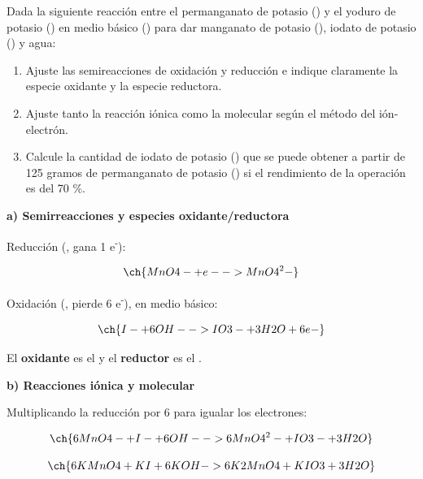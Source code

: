 \begin{exerciseEVAU}

Dada la siguiente reacción entre el permanganato de potasio () y el yoduro de potasio () en medio básico () para dar manganato de potasio (), iodato de potasio () y agua:
    \begin{enumerate}[label=\letraminuscula]
        \item Ajuste las semireacciones de oxidación y reducción e indique claramente la especie
oxidante y la especie reductora.
        \item Ajuste tanto la reacción iónica como la molecular según el método del ión-electrón.
        \item Calcule la cantidad de iodato de potasio () que se puede obtener a partir de 125 gramos de permanganato de potasio () si el rendimiento de la operación es del 70 \%.
    \end{enumerate}

    \begin{solu}

        \textbf{a) Semirreacciones y especies oxidante/reductora}

        Reducción (, gana 1 e\textsuperscript{-}):

        \begin{equation*}
            \ch{MnO4- + e- -> MnO4^2-}
        \end{equation*}

        Oxidación (, pierde 6 e\textsuperscript{-}), en medio básico:

        \begin{equation*}
            \ch{I- + 6 OH- -> IO3- + 3 H2O + 6 e-}
        \end{equation*}

        El \textbf{oxidante} es el  y el \textbf{reductor} es el .

        \textbf{b) Reacciones iónica y molecular}

        Multiplicando la reducción por 6 para igualar los electrones:

        \begin{equation*}
            \ch{6 MnO4- + I- + 6 OH- -> 6 MnO4^2- + IO3- + 3 H2O}
        \end{equation*}

        \begin{equation*}
            \ch{6 KMnO4 + KI + 6 KOH -> 6 K2MnO4 + KIO3 + 3 H2O}
        \end{equation*}


\end{solu}
\end{exerciseEVAU}
